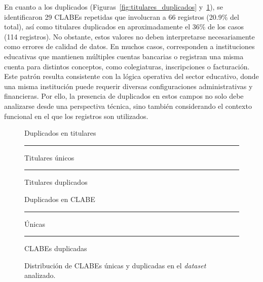 En cuanto a los duplicados (Figuras~\ref{fig:titulares_duplicados} y~\ref{fig:clabe_duplicadas}), se identificaron 29 CLABEs repetidas que involucran a 66 registros (20.9\% del total), así como titulares duplicados en aproximadamente el 36\% de los casos (114 registros). No obstante, estos valores no deben interpretarse necesariamente como errores de calidad de datos. En muchos casos, corresponden a instituciones educativas que mantienen múltiples cuentas bancarias o registran una misma cuenta para distintos conceptos, como colegiaturas, inscripciones o facturación. Este patrón resulta consistente con la lógica operativa del sector educativo, donde una misma institución puede requerir diversas configuraciones administrativas y financieras. Por ello, la presencia de duplicados en estos campos no solo debe analizarse desde una perspectiva técnica, sino también considerando el contexto funcional en el que los registros son utilizados.


\begin{figure}[H]
    \centering
    \begin{minipage}{0.42\textwidth}
        \centering
        {\footnotesize Duplicados en titulares}
        

        {\scriptsize
        \textcolor{blue!20}{\rule{0.3cm}{0.3cm}} Titulares únicos \quad
        \textcolor{blue!40}{\rule{0.3cm}{0.3cm}} Titulares duplicados
        }
        
        \caption{Distribución de titulares únicos y duplicados en el \textit{dataset} analizado.}
        \label{fig:titulares_duplicados}
    \end{minipage}
    \hfill
    \begin{minipage}{0.42\textwidth}
        \centering
        {\footnotesize Duplicados en CLABE}
        

        {\scriptsize
        \textcolor{blue!20}{\rule{0.3cm}{0.3cm}} Únicas \quad
        \textcolor{blue!40}{\rule{0.3cm}{0.3cm}} CLABEs duplicadas
        }
        
        \caption{Distribución de CLABEs únicas y duplicadas en el \textit{dataset} analizado.}
        \label{fig:clabe_duplicadas}
    \end{minipage}
\end{figure}

